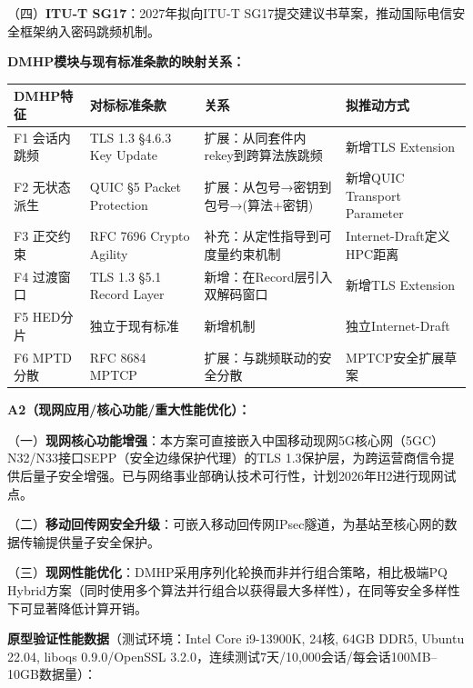 ﻿\documentclass[12pt,a4paper]{article}
\begin{document}
{{（四）\textbf{ITU-T SG17}：2027年拟向ITU-T SG17提交建议书草案，推动国际电信安全框架纳入密码跳频机制。

\textbf{DMHP模块与现有标准条款的映射关系：}


\begin{tabular}{|p{2.5cm}|p{3.5cm}|p{4.5cm}|p{3.5cm}|}
\hline
\textbf{DMHP特征} & \textbf{对标标准条款} & \textbf{关系} & \textbf{拟推动方式} \\
\hline
F1 会话内跳频 & TLS 1.3 §4.6.3 Key Update & 扩展：从同套件内rekey到跨算法族跳频 & 新增TLS Extension \\
\hline
F2 无状态派生 & QUIC §5 Packet Protection & 扩展：从包号→密钥到包号→(算法+密钥) & 新增QUIC Transport Parameter \\
\hline
F3 正交约束 & RFC 7696 Crypto Agility & 补充：从定性指导到可度量约束机制 & Internet-Draft定义HPC距离 \\
\hline
F4 过渡窗口 & TLS 1.3 §5.1 Record Layer & 新增：在Record层引入双解码窗口 & 新增TLS Extension \\
\hline
F5 HED分片 & 独立于现有标准 & 新增机制 & 独立Internet-Draft \\
\hline
F6 MPTD分散 & RFC 8684 MPTCP & 扩展：与跳频联动的安全分散 & MPTCP安全扩展草案 \\
\hline
\end{tabular}

\textbf{A2（现网应用/核心功能/重大性能优化）：}

（一）\textbf{现网核心功能增强}：本方案可直接嵌入中国移动现网5G核心网（5GC）N32/N33接口SEPP（安全边缘保护代理）的TLS 1.3保护层，为跨运营商信令提供后量子安全增强。已与网络事业部确认技术可行性，计划2026年H2进行现网试点。

（二）\textbf{移动回传网安全升级}：可嵌入移动回传网IPsec隧道，为基站至核心网的数据传输提供量子安全保护。

（三）\textbf{现网性能优化}：DMHP采用序列化轮换而非并行组合策略，相比极端PQ Hybrid方案（同时使用多个算法并行组合以获得最大多样性），在同等安全多样性下可显著降低计算开销。

\textbf{原型验证性能数据}（测试环境：Intel Core i9-13900K, 24核, 64GB DDR5, Ubuntu 22.04, liboqs 0.9.0/OpenSSL 3.2.0，连续测试7天/10,000会话/每会话100MB--10GB数据量）：

\begin{center}


\end{center}}}
\end{document}

